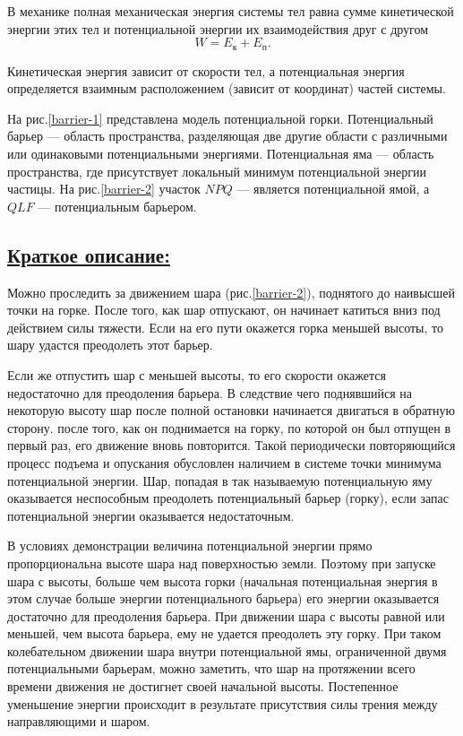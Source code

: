 \documentclass[14pt,a4paper,oneside]{extarticle}	%
\begin{document}
		В механике полная механическая энергия системы тел равна сумме кинетической энергии этих тел и потенциальной энергии их взаимодействия друг с другом
$$ W = E_{\text{к}} + E_{\text{п}}.$$

Кинетическая энергия зависит от скорости тел, а потенциальная энергия определяется взаимным расположением (зависит от координат) частей системы.

На рис.\ref{barrier-1} представлена модель потенциальной горки.
Потенциальный барьер — область пространства, разделяющая две другие области с различными или одинаковыми потенциальными энергиями.
Потенциальная яма — область пространства, где присутствует локальный минимум потенциальной энергии частицы.	
На рис.\ref{barrier-2} участок $ NPQ $ — является потенциальной ямой, а $ QLF $ — потенциальным барьером.	

	\subsection*{\underline{Краткое описание:}}
 
Можно проследить за движением шара (рис.\ref{barrier-2}), поднятого до наивысшей точки на горке.
После того, как шар отпускают, он начинает катиться вниз под действием силы тяжести.
Если на его пути окажется горка меньшей высоты, то шару удастся преодолеть этот барьер. 

Если же отпустить шар с меньшей высоты, то его скорости окажется недостаточно для преодоления барьера. 
В следствие чего поднявшийся на некоторую высоту шар после полной остановки начинается двигаться в обратную сторону.
после того, как он поднимается на горку, по которой он был отпущен в первый раз, его движение вновь повторится.
Такой периодически повторяющийся процесс подъема и опускания обусловлен наличием в системе точки минимума потенциальной энергии.
Шар, попадая в так называемую потенциальную яму оказывается неспособным преодолеть потенциальный барьер (горку), если запас потенциальной энергии оказывается недостаточным.

В условиях демонстрации величина потенциальной энергии прямо пропорциональна высоте шара над поверхностью земли.
Поэтому при запуске шара с высоты, больше чем высота горки (начальная потенциальная энергия в этом случае больше энергии потенциального барьера) его энергии оказывается достаточно для преодоления барьера.
При движении шара с высоты равной или меньшей, чем высота барьера, ему не удается преодолеть эту горку.
При таком колебательном движении шара внутри потенциальной ямы, ограниченной двумя потенциальными барьерам, можно заметить, что шар на протяжении всего времени движения не достигнет своей начальной высоты.
Постепенное уменьшение энергии происходит в результате присутствия силы трения между направляющими и шаром.
\end{document}
